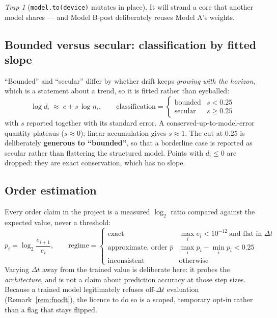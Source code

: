 \documentclass[11pt,a4paper]{article}
\theoremstyle{plain}
\theoremstyle{definition}
\theoremstyle{remark}
\newtheorem{trap}[theorem]{Trap}
\newcommand{\dt}{\Delta t}
\begin{document}
\begin{trap}[\texttt{model.to(device)} mutates in place]
It will strand a core that another model shares --- and Model B-post deliberately reuses
Model A's weights.
\end{trap}

\subsection{Bounded versus secular: classification by fitted slope}
\label{sec:drift}

``Bounded'' and ``secular'' differ by whether drift keeps \emph{growing with the horizon},
which is a statement about a trend, so it is fitted rather than eyeballed:
\[
\log d_i \;\approx\; c + s\,\log n_i,
\qquad
\text{classification} = \begin{cases}\text{bounded} & s < 0.25\\ \text{secular} & s\ge 0.25\end{cases}
\]
with $s$ reported together with its standard error. A conserved-up-to-model-error quantity
plateaus ($s\approx0$); linear accumulation gives $s\approx1$. The cut at $0.25$ is
deliberately \textbf{generous to ``bounded''}, so that a borderline case is reported as
secular rather than flattering the structured model. Points with $d_i\le0$ are dropped:
they are exact conservation, which has no slope.

\subsection{Order estimation}

Every order claim in the project is a measured $\log_2$ ratio compared against the
expected value, never a threshold:
\[
p_i = \log_2\frac{e_{i+1}}{e_i},
\qquad
\text{regime} = \begin{cases}
\text{exact} & \max_i e_i < 10^{-12}\ \text{and flat in }\dt\\
\text{approximate, order } \bar p & \max_i p_i - \min_i p_i < 0.25\\
\text{inconsistent} & \text{otherwise}
\end{cases}
\]
Varying $\dt$ away from the trained value is deliberate here: it probes the
\emph{architecture}, and is not a claim about prediction accuracy at those step sizes.
Because a trained model legitimately refuses off-$\dt$ evaluation
(Remark~\ref{rem:fnodt}), the licence to do so is a scoped, temporary opt-in rather than a
flag that stays flipped.
\end{document}
